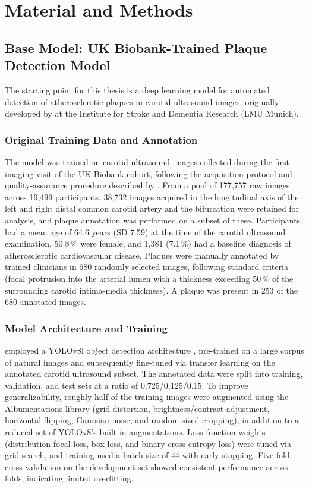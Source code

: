 \chapter{Material and Methods}
\label{ch:methods}

\section{Base Model: UK Biobank-Trained Plaque Detection Model}
\label{sec:base-model}

The starting point for this thesis is a deep learning model for automated detection of
atherosclerotic plaques in carotid ultrasound images, originally developed by
\textcite{omarov2024deep} at the Institute for Stroke and Dementia Research (LMU Munich).

\subsection{Original Training Data and Annotation}
The model was trained on carotid ultrasound images collected during the first imaging visit of
the UK Biobank cohort, following the acquisition protocol and quality-assurance procedure
described by \textcite{coffey2017protocol}. From a pool of 177{,}757 raw images across 19{,}499 participants,
38{,}732 images acquired in the longitudinal axis of the left and right distal common carotid
artery and the bifurcation were retained for analysis, and plaque annotation was performed on a
subset of these. Participants had a mean age of 64.6 years (SD 7.59) at the time of the carotid
ultrasound examination, 50.8\,\% were female, and 1{,}381 (7.1\,\%) had a baseline diagnosis of
atherosclerotic cardiovascular disease. Plaques were manually annotated by trained clinicians in
680 randomly selected images, following standard criteria \cite{touboul2012mannheim} (focal
protrusion into the arterial lumen with a thickness exceeding 50\,\% of the surrounding carotid
intima-media thickness). A plaque was present in 253 of the 680 annotated images.

\subsection{Model Architecture and Training}
\textcite{omarov2024deep} employed a YOLOv8l object detection architecture
\cite{jocher2023ultralytics}, pre-trained on a large corpus of natural images and subsequently
fine-tuned via transfer learning on the annotated carotid ultrasound subset. The annotated data
were split into training, validation, and test sets at a ratio of 0.725/0.125/0.15. To improve
generalizability, roughly half of the training images were augmented using the Albumentations
library \cite{buslaev2020albumentations} (grid distortion, brightness/contrast adjustment,
horizontal flipping, Gaussian noise, and random-sized cropping), in addition to a reduced set of
YOLOv8's built-in augmentations. Loss function weights
(distribution focal loss, box loss, and binary cross-entropy loss) were tuned via grid search,
and training used a batch size of 44 with early stopping. Five-fold cross-validation on the
development set showed consistent performance across folds, indicating limited overfitting.

